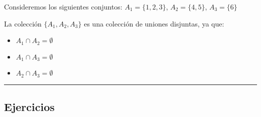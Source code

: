 \begin{fmd-example}
	Consideremos los siguientes conjuntos: \(A_1 = \{1, 2, 3\}\), \(A_2 = \{4, 5\}\), \(A_3 = \{6\}\)
	
	La colección \(\{A_1, A_2, A_3\}\) es una colección de uniones disjuntas, ya que:
	\begin{itemize}[itemsep=0pt]
		\item \(A_1 \cap A_2 = \emptyset\)
		\item \(A_1 \cap A_3 = \emptyset\)
		\item \(A_2 \cap A_3 = \emptyset\)
	\end{itemize}
\end{fmd-example}

\rule{\textwidth}{.5pt}

\subsection{Ejercicios}


